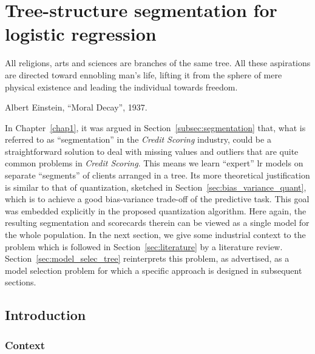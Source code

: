 \chapter{Tree-structure segmentation for logistic regression} \label{chap6}


\epigraph{All religions, arts and sciences are branches of the same tree. All these aspirations are directed toward ennobling man's life, lifting it from the sphere of mere physical existence and leading the individual towards freedom.}{Albert Einstein, ``Moral Decay'', 1937.}

\minitoc

\bigskip

In Chapter~\ref{chap1}, it was argued in Section~\ref{subsec:segmentation} that, what is referred to as ``segmentation'' in the \textit{Credit Scoring} industry, could be a straightforward solution to deal with missing values and outliers that are quite common problems in \textit{Credit Scoring}. This means we learn ``expert'' \gls{lr} models on separate ``segments'' of clients arranged in a tree. Its more theoretical justification is similar to that of quantization, sketched in Section~\ref{sec:bias_variance_quant}, which is to achieve a good bias-variance trade-off of the predictive task. This goal was embedded explicitly in the proposed quantization algorithm. Here again, the resulting segmentation and scorecards therein can be viewed as a single model for the whole population. In the next section, we give some industrial context to the problem which is followed in Section~\ref{sec:literature} by a literature review. Section~\ref{sec:model_selec_tree} reinterprets this problem, as advertised, as a model selection problem for which a specific approach is designed in subsequent sections.


\section{Introduction}

\subsection{Context} \label{subsec:context}

